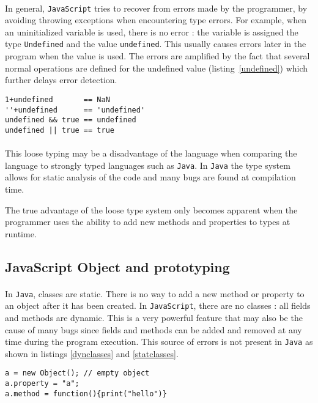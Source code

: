 \paragraph{}
In general, \texttt{JavaScript} tries to recover from errors made by the programmer, by avoiding throwing exceptions when encountering type errors. For example, when an uninitialized variable is used, there is no error : the variable is assigned the type \texttt{Undefined} and the value \texttt{undefined}. This usually causes errors later in the program when the value is used. The errors are amplified by the fact that several normal operations are defined for the undefined value (listing~\ref{undefined}) which further delays error detection.
\begin{lstlisting}[caption=Normal operations on undefined value,label=undefined]
1+undefined       == NaN
''+undefined      == 'undefined'
undefined && true == undefined
undefined || true == true
\end{lstlisting}	
\paragraph{}
This loose typing may be a disadvantage of the language when comparing the language to strongly typed languages such as \texttt{Java}. In \texttt{Java} the type system allows for static analysis of the code and many bugs are found at compilation time. 

The true advantage of the loose type system only becomes apparent when the programmer uses the ability to add new methods and properties to types at runtime.

\subsection{JavaScript Object and prototyping}
\paragraph{}
In \texttt{Java}, classes are static. There is no way to add a new method or property to an object after it has been created. In \texttt{JavaScript}, there are no classes : all fields and methods are dynamic. This is a very powerful feature that may also be the cause of many bugs since fields and methods can be added and removed at any time during the program execution. This source of errors is not present in \texttt{Java} as shown in listings \ref{dynclasses} and \ref{statclasses}.

\begin{lstlisting}[caption=JavaScript,label=dynclasses]
a = new Object(); // empty object
a.property = "a";
a.method = function(){print("hello")}
\end{lstlisting}	

